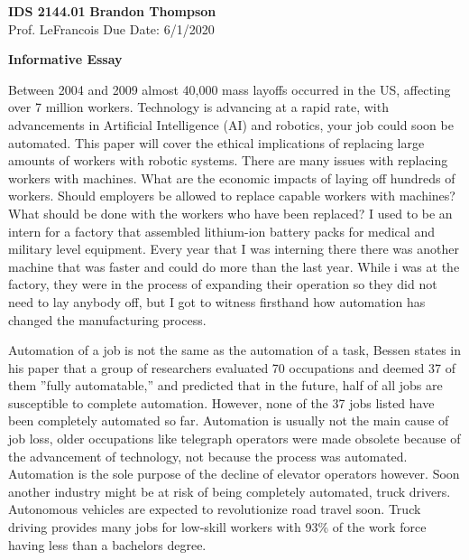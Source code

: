\documentclass[12pt]{article}
\begin{document}
\noindent
\textbf{IDS 2144.01} \hfill \textbf{Brandon Thompson} \\
\normalsize Prof. LeFrancois \hfill Due Date: 6/1/2020 \\

\begin{center}
\textbf{Informative Essay}
\end{center}

	Between 2004 and 2009 almost 40,000 mass layoffs occurred in the US, affecting over
	7 million workers. \autocite{sucher} Technology is advancing at a rapid rate, with
	advancements in Artificial Intelligence (AI) and robotics, your job could soon be
	automated. This paper will cover the ethical implications of replacing large amounts
	of workers with robotic systems. There are many issues with replacing workers with
	machines. What are the economic impacts of laying off hundreds of workers. Should 
	employers be allowed to replace capable workers with machines? What should be done
	with the workers who have been replaced? I used to be an intern for a factory that
	assembled lithium-ion battery packs for medical and military level equipment. Every
	year that I was interning there there was another machine that was faster and could
	do more than the last year. While i was at the factory, they were in the process of
	expanding their operation so they did not need to lay anybody off, but I got to
	witness firsthand how automation has changed the manufacturing process.
	
	Automation of a job is not the same as the automation of a task, Bessen states in his
	paper that a group of researchers  evaluated 70 occupations and deemed 37 of them
	''fully automatable,'' and predicted that in the future, half of all jobs are
	susceptible to complete automation. However, none of the 37 jobs listed have been
	completely automated so far. \autocite{bessen} Automation is usually not the main
	cause of job loss, older occupations like telegraph operators were made obsolete
	because of the advancement of technology, not because the process was automated.
	Automation is the sole purpose of the decline of elevator operators however.
	Soon another industry might be at risk of being completely automated, truck drivers.
	Autonomous vehicles are expected to revolutionize road travel soon.
	Truck driving provides many jobs for low-skill workers with 93\% of the work force
	having less than a bachelors degree.\autocite{algernon}
	
\end{document}
